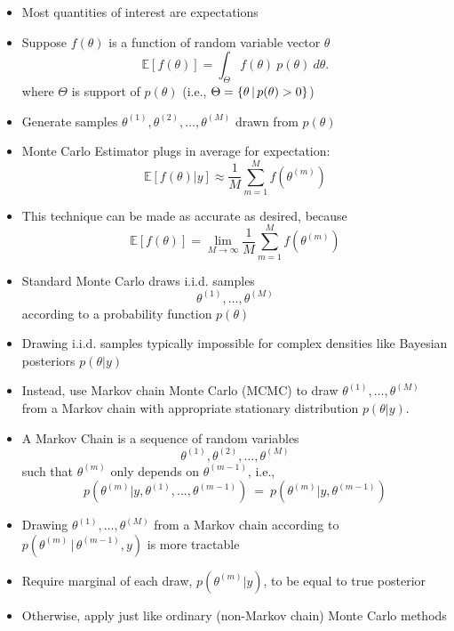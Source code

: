 \documentclass[10pt]{report}
\begin{document}
%
\begin{itemize}
\item Most quantities of interest are expectations
\item Suppose $f(\theta)$ is a function of random variable vector $\theta$
  \[
  \mathbb{E}[f(\theta)] = \int_{\Theta} f(\theta) \ p(\theta) \ d\theta.
  \]
where $\Theta$ is support of $p(\theta)$ (i.e., $\Theta =
\{ \theta \, | \, p(\theta) > 0 \}$)
\item Generate samples $\theta^{(1)}, \theta^{(2)}, \ldots,
  \theta^{(M)}$ drawn from $p(\theta)$
\item Monte Carlo Estimator plugs in average for expectation:
  \[
  \mathbb{E}[f(\theta)|y] \approx \frac{1}{M} \sum_{m=1}^M f(\theta^{(m)})
  \]
\item This technique can be made as accurate as desired, because
\[
\mathbb{E}[f(\theta)] 
= 
\lim_{M \rightarrow \infty}
\frac{1}{M} \sum_{m=1}^M f(\theta^{(m)})
\]
\end{itemize}




%
\begin{itemize}
\item Standard Monte Carlo draws i.i.d. samples
\[
\theta^{(1)}, \ldots, \theta^{(M)}
\]
according to a probability function $p(\theta)$
\item Drawing i.i.d. samples typically impossible for
  complex densities like Bayesian posteriors $p(\theta|y)$
\item Instead, use Markov chain Monte Carlo (MCMC) to
  draw $\theta^{(1)}, \ldots, \theta^{(M)}$ from a Markov chain
  with appropriate stationary distribution $p(\theta | y)$.
\end{itemize}


%
\begin{itemize}
\item A Markov Chain is a sequence of random variables 
\[
\theta^{(1)},
  \theta^{(2)}, \ldots, \theta^{(M)}
\]
such that $\theta^{(m)}$ only depends on $\theta^{(m-1)}$, i.e.,
\[
p(\theta^{(m)} | y, \theta^{(1)}, \ldots, \theta^{(m-1)})
\ = \
p(\theta^{(m)} | y, \theta^{(m-1)})
\]
\item Drawing $\theta^{(1)}, \ldots, \theta^{(M)}$ from a Markov chain
  according to \\ $p(\theta^{(m)} \, | \, \theta^{(m-1)}, y)$ is more tractable
\item Require marginal of each draw, $p(\theta^{(m)}|y)$,
  to be equal to true posterior
\item Otherwise, apply just like ordinary (non-Markov chain) Monte Carlo methods
\end{itemize}
\end{document}
